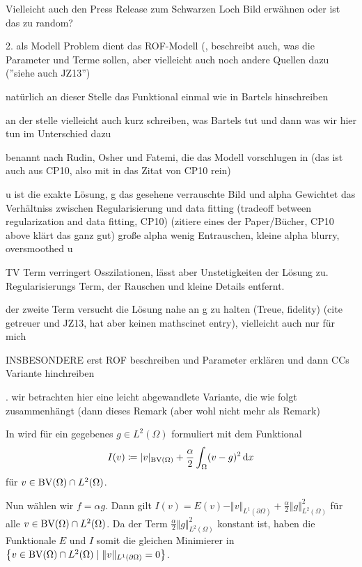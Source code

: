 Vielleicht auch den Press Release zum Schwarzen Loch Bild erwähnen oder ist
das zu random?


\medskip

2. als Modell Problem dient das ROF-Modell (\cite[sec 6.2.1]{CP10}, beschreibt
auch,
was die Parameter und Terme sollen, aber vielleicht auch noch andere Quellen 
dazu (''siehe auch JZ13'')

\medskip
natürlich an dieser Stelle das Funktional einmal wie in Bartels hinschreiben

an der stelle vielleicht auch kurz schreiben, was Bartels tut und dann was wir
hier tun im Unterschied dazu

\medskip

benannt nach Rudin, Osher und Fatemi, die das Modell vorschlugen in
\cite{ROF92} (das ist auch aus CP10, also mit in das Zitat von CP10 rein)

\medskip
u ist die exakte Lösung, g das gesehene verrauschte Bild und alpha Gewichtet 
das Verhältniss zwischen Regularisierung und data fitting (tradeoff
between regularization and data fitting, CP10)
(zitiere eines der Paper/Bücher, CP10 above klärt das ganz gut)
große alpha wenig Entrauschen, kleine alpha blurry, oversmoothed u
\cite{JZ13}

\medskip
TV Term verringert Osszilationen, lässt aber Unstetigkeiten der Lösung zu.
Regularisierungs Term, der Rauschen und kleine Details entfernt.

\medskip
der zweite Term versucht die Lösung nahe an g zu halten (Treue, fidelity) (cite
getreuer und JZ13, hat aber keinen mathscinet entry), vielleicht auch nur
für mich

\medskip
INSBESONDERE erst ROF beschreiben und Parameter erklären und dann CCs 
Variante hinchreiben

. wir betrachten hier eine leicht abgewandlete Variante, die wie folgt
zusammenhängt (dann dieses Remark (aber wohl nicht mehr als Remark)

\begin{remark}
  In \cite[Kapitel~10.1.3]{Bar15} wird  für ein
  gegebenes $g\in L^2(\Omega)$ formuliert
  mit dem Funktional 
  \begin{align*}
    I(v)\coloneqq |v|_{\textup{BV}(\Omega)} + \frac{\alpha}{2}\int_\Omega (v-g)^2\,\mathrm{d}x
  \end{align*}
  für $v\in \textup{BV}(\Omega)\cap L^2(\Omega)$.

  Nun wählen wir $f = \alpha g$. Dann gilt
  $I(v) = E(v) - \Vert v\Vert_{L^1(\partial \Omega)}+ 
  \frac{\alpha}{2}\Vert g\Vert_{L^2(\Omega)}^2$ für alle 
  $v\in \textup{BV}(\Omega)\cap L^2(\Omega)$. Da der Term $\frac{\alpha}{2}\Vert
  g\Vert_{L^2(\Omega)}^2$ konstant ist, haben die Funktionale $E$ und $I$ somit
  die gleichen Minimierer in $\left\{v\in\textup{BV}(\Omega)\cap L^2(\Omega)\mid 
  \Vert v\Vert_{L^1(\partial\Omega)}=0\right\}$.
\end{remark}

